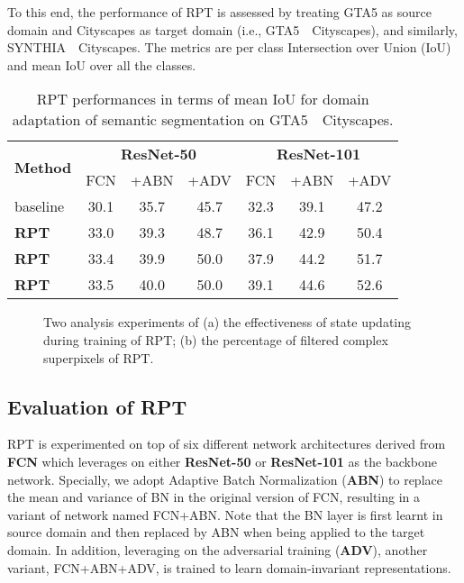 \documentclass[10pt,twocolumn,letterpaper]{article}
\begin{document}
To this end, the performance of RPT is assessed by treating GTA5 as source domain and Cityscapes as target domain (i.e., GTA5~~Cityscapes), and similarly, SYNTHIA~~Cityscapes. The metrics are per class Intersection over Union (IoU) and mean IoU over all the classes.

\begin{table}
   \centering
   \small
   \caption{\small RPT performances in terms of mean IoU for domain adaptation of semantic segmentation on GTA5~~Cityscapes.}
   \begin{tabular}{l|c@{~~}c@{~~}c|c@{~~}c@{~~}c} \hline
      \multirow{2}{*}{\textbf{Method}}  & \multicolumn{3}{c|}{\textbf{ResNet-50}}& \multicolumn{3}{c}{\textbf{ResNet-101}}\\
      & FCN & +ABN & +ADV & FCN & +ABN & +ADV \\ \hline
      baseline & 30.1 & 35.7 & 45.7 & 32.3 & 39.1 & 47.2 \\ \hline
      \textbf{RPT} & 33.0 & 39.3 & 48.7 & 36.1 & 42.9 & 50.4 \\
      \textbf{RPT} &  33.4 & 39.9 & 50.0 & 37.9 & 44.2 & 51.7\\
      \textbf{RPT} & 33.5 & 40.0 & 50.0 & 39.1 & 44.6 & 52.6\\ \hline
   \end{tabular}
   \label{tab:effectiveness}
   \vspace{-0.15in}
\end{table}

\begin{figure}[!tb]
   \centering
   \caption{\small Two analysis experiments of (a) the effectiveness of state updating during training of RPT; (b) the percentage of filtered complex superpixels of RPT.}
   \label{fig:curve}
   \vspace{-0.15in}
\end{figure}
\subsection{Evaluation of RPT}
RPT is experimented on top of six different network architectures derived from \textbf{FCN} which leverages on either \textbf{ResNet-50} or \textbf{ResNet-101} as the backbone network. Specially, we adopt Adaptive Batch Normalization (\textbf{ABN}) to replace the mean and variance of BN in the original version of FCN, resulting in a variant of network named FCN+ABN. Note that the BN layer is first learnt in source domain and then replaced by ABN when being applied to the target domain. In addition, leveraging on the adversarial training (\textbf{ADV}), another variant, FCN+ABN+ADV, is trained to learn domain-invariant representations.
\end{document}
